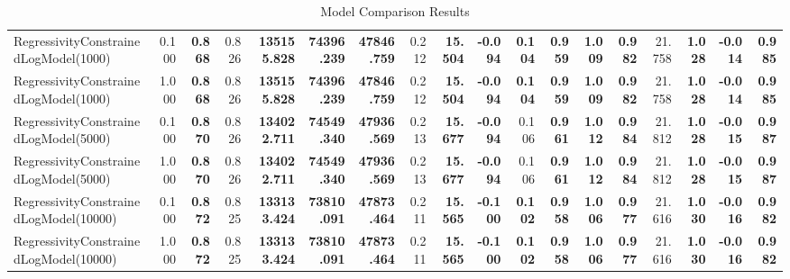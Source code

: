 \documentclass[11pt]{article}
\theoremstyle{plain}
\theoremstyle{definition}
\newcommand{\1}{\mathbf{1}}
\begin{document}
\begin{table}[htbp]
{\begin{tabular}{lrrrrrrrrrrrrrrrrr}
RegressivityConstrainedLogModel(1000) & 0.100 & \textbf{0.868} & 0.826 & \textbf{135155.828} & \textbf{74396.239} & \textbf{47846.759} & 0.212 & \textbf{15.504} & \textbf{-0.094} & \textbf{0.104} & \textbf{0.959} & \textbf{1.009} & \textbf{0.982} & 21.758 & \textbf{1.028} & \textbf{-0.014} & \textbf{0.985} \\
RegressivityConstrainedLogModel(1000) & 1.000 & \textbf{0.868} & 0.826 & \textbf{135155.828} & \textbf{74396.239} & \textbf{47846.759} & 0.212 & \textbf{15.504} & \textbf{-0.094} & \textbf{0.104} & \textbf{0.959} & \textbf{1.009} & \textbf{0.982} & 21.758 & \textbf{1.028} & \textbf{-0.014} & \textbf{0.985} \\
RegressivityConstrainedLogModel(5000) & 0.100 & \textbf{0.870} & 0.826 & \textbf{134022.711} & \textbf{74549.340} & \textbf{47936.569} & 0.213 & \textbf{15.677} & \textbf{-0.094} & 0.106 & \textbf{0.961} & \textbf{1.012} & \textbf{0.984} & 21.812 & \textbf{1.028} & \textbf{-0.015} & \textbf{0.987} \\
RegressivityConstrainedLogModel(5000) & 1.000 & \textbf{0.870} & 0.826 & \textbf{134022.711} & \textbf{74549.340} & \textbf{47936.569} & 0.213 & \textbf{15.677} & \textbf{-0.094} & 0.106 & \textbf{0.961} & \textbf{1.012} & \textbf{0.984} & 21.812 & \textbf{1.028} & \textbf{-0.015} & \textbf{0.987} \\
RegressivityConstrainedLogModel(10000) & 0.100 & \textbf{0.872} & 0.825 & \textbf{133133.424} & \textbf{73810.091} & \textbf{47873.464} & 0.211 & \textbf{15.565} & \textbf{-0.100} & \textbf{0.102} & \textbf{0.958} & \textbf{1.006} & \textbf{0.977} & 21.616 & \textbf{1.030} & \textbf{-0.016} & \textbf{0.982} \\
RegressivityConstrainedLogModel(10000) & 1.000 & \textbf{0.872} & 0.825 & \textbf{133133.424} & \textbf{73810.091} & \textbf{47873.464} & 0.211 & \textbf{15.565} & \textbf{-0.100} & \textbf{0.102} & \textbf{0.958} & \textbf{1.006} & \textbf{0.977} & 21.616 & \textbf{1.030} & \textbf{-0.016} & \textbf{0.982} \\
\bottomrule
\end{tabular}
     }
    \caption{Model Comparison Results}
    \label{tab:model_comparison}
\end{table}
\end{document}
